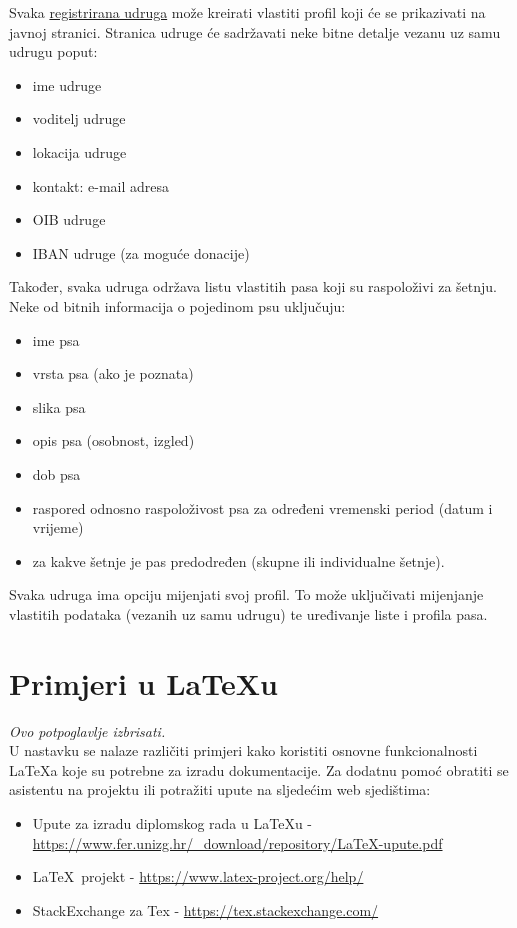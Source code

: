 	Svaka \underline{registrirana udruga} može kreirati vlastiti profil koji će se prikazivati na javnoj
	stranici. Stranica udruge će sadržavati neke bitne detalje vezanu uz samu udrugu poput: 
	\begin{itemize}
		\item ime udruge
		\item voditelj udruge
		\item lokacija udruge
		\item kontakt: e-mail adresa
		\item OIB udruge
		\item IBAN udruge (za moguće donacije)
	\end{itemize}
Također, svaka udruga održava listu vlastitih pasa koji su raspoloživi za šetnju. Neke od bitnih informacija o pojedinom psu uključuju: 
	\begin{itemize}
		\item ime psa
		\item vrsta psa (ako je poznata)
		\item slika psa 
		\item opis psa (osobnost, izgled)
		\item dob psa
		\item raspored odnosno raspoloživost psa za određeni vremenski period (datum i vrijeme) 
		\item za kakve šetnje je pas predodređen (skupne ili individualne šetnje). 
	\end{itemize}
Svaka udruga ima opciju mijenjati svoj profil. To može uključivati mijenjanje vlastitih podataka (vezanih uz samu udrugu) te uređivanje liste i profila pasa. 





\vspace{15pt}
	  \vspace{20pt}

		
		\section{Primjeri u \LaTeX u}
		
		\textit{Ovo potpoglavlje izbrisati.}\\

		U nastavku se nalaze različiti primjeri kako koristiti osnovne funkcionalnosti \LaTeX a koje su potrebne za izradu dokumentacije. Za dodatnu pomoć obratiti se asistentu na projektu ili potražiti upute na sljedećim web sjedištima:
		\begin{itemize}
			\item Upute za izradu diplomskog rada u \LaTeX u - \url{https://www.fer.unizg.hr/_download/repository/LaTeX-upute.pdf}
			\item \LaTeX\ projekt - \url{https://www.latex-project.org/help/}
			\item StackExchange za Tex - \url{https://tex.stackexchange.com/}\\
		
		\end{itemize} 	


